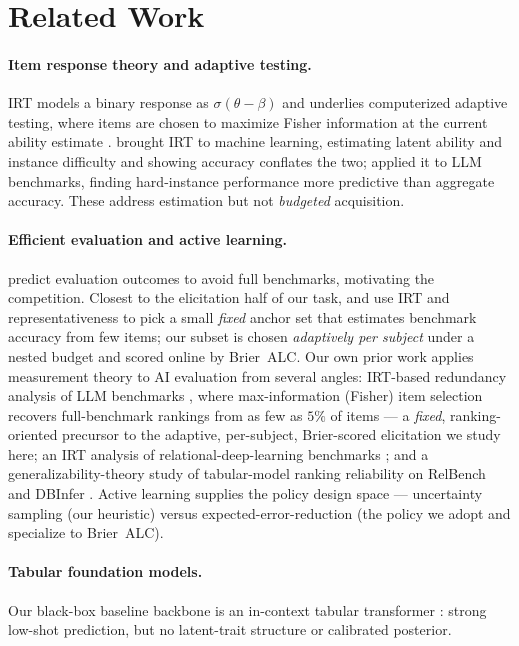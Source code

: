\documentclass{article}
\begin{document}
\section{Related Work}

\paragraph{Item response theory and adaptive testing.} IRT models a binary
response as $\sigma(\theta-\beta)$ and underlies computerized adaptive testing,
where items are chosen to maximize Fisher information at the current ability
estimate \citep{lord1980, embretson2000}. \citet{martinezplumed2019} brought IRT
to machine learning, estimating latent ability and instance difficulty and
showing accuracy conflates the two; \citet{zhou2026} applied it to LLM
benchmarks, finding hard-instance performance more predictive than aggregate
accuracy. These address estimation but not \emph{budgeted} acquisition.

\paragraph{Efficient evaluation and active learning.}
\citet{truong2025amortized} predict evaluation outcomes to avoid full
benchmarks, motivating the competition. Closest to the elicitation half of our
task, \citet{polo2024tinybenchmarks} and \citet{vivek2024anchor} use IRT and
representativeness to pick a small \emph{fixed} anchor set that estimates
benchmark accuracy from few items; our subset is chosen \emph{adaptively per
subject} under a nested budget and scored online by Brier~ALC. Our own prior
work applies measurement theory to AI evaluation from several angles: IRT-based
redundancy analysis of LLM benchmarks \citep{ramprasath2026redundancy}, where
max-information (Fisher) item selection recovers full-benchmark rankings from as
few as $5\%$ of items --- a \emph{fixed}, ranking-oriented precursor to the
adaptive, per-subject, Brier-scored elicitation we study here; an IRT analysis of
relational-deep-learning benchmarks \citep{ramprasath2026relbenchirt}; and a
generalizability-theory study of tabular-model ranking reliability on RelBench
and DBInfer \citep{ramprasath2026gtheory}. Active learning
\citep{settles2009} supplies the policy design space --- uncertainty sampling
(our heuristic) versus expected-error-reduction (the policy we adopt and
specialize to Brier~ALC).

\paragraph{Tabular foundation models.} Our black-box baseline backbone is an
in-context tabular transformer \citep{hollmann2023tabpfn, ye2025tabicl}: strong
low-shot prediction, but no latent-trait structure or calibrated posterior.
\end{document}
